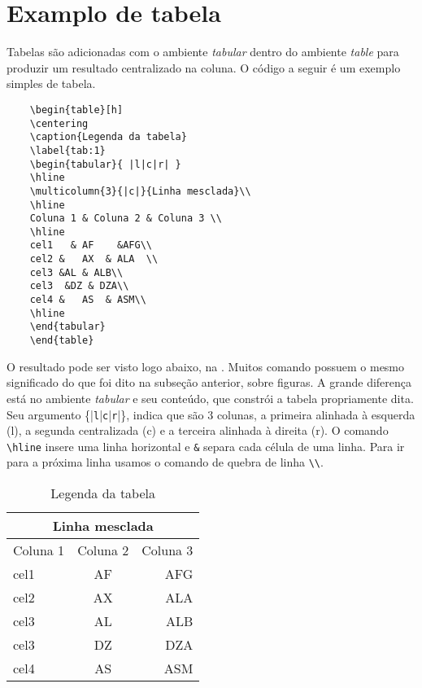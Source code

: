\documentclass{article}
\begin{document}
\section{Examplo de tabela}
Tabelas são adicionadas com o ambiente \textit{tabular} dentro do ambiente \textit{table} para produzir um resultado centralizado na coluna. O código a seguir é um exemplo simples de tabela.
\begin{verbatim}
	\begin{table}[h]
	\centering
	\caption{Legenda da tabela}
	\label{tab:1}
	\begin{tabular}{ |l|c|r| }
	\hline
	\multicolumn{3}{|c|}{Linha mesclada}\\
	\hline
	Coluna 1 & Coluna 2 & Coluna 3 \\
	\hline
	cel1   & AF    &AFG\\
	cel2 &   AX  & ALA  \\
	cel3 &AL & ALB\\
	cel3  &DZ & DZA\\
	cel4 &   AS  & ASM\\
	\hline
	\end{tabular}
	\end{table}
\end{verbatim}

O resultado pode ser visto logo abaixo, na . Muitos comando possuem o mesmo significado do que foi dito na subseção anterior, sobre figuras. A grande diferença está no ambiente \textit{tabular} e seu conteúdo, que constrói a tabela propriamente dita. Seu argumento \{|\verb|l||\verb|c||\verb|r||\}, indica que são 3 colunas, a primeira alinhada à esquerda (l), a segunda centralizada (c) e a terceira alinhada à direita (r). O comando \verb|\hline| insere uma linha horizontal e \verb|&| separa cada célula de uma linha. Para ir para a próxima linha usamos o comando de quebra de linha \verb|\\|.
\begin{table}[h]
        \renewcommand{\arraystretch}{1.2}
	\centering
	\caption{Legenda da tabela}
	\label{tab:1}
\begin{tabular}{ l|c|r }
	\hline\hline
	\multicolumn{3}{c}{Linha mesclada}\\
	\hline
	Coluna 1 & Coluna 2 & Coluna 3 \\
	\hline
	cel1   & AF    &AFG\\
	cel2 &   AX  & ALA  \\
	cel3 &AL & ALB\\
	cel3  &DZ & DZA\\
	cel4 &   AS  & ASM\\
	\hline\hline
\end{tabular}
\end{table}
\end{document}
